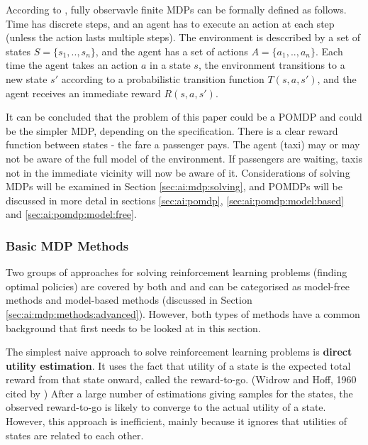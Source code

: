 According to \textcite{Spaan2012ai+pomdp}, fully observavle finite MDPs can be
formally defined as follows. Time has discrete steps, and an agent has to
execute an action at each step (unless the action lasts multiple steps). The
environment is desccribed by a set of states \(S = \{s_1,..,s_n\}\), and the
agent has a set of actions \(A = \{a_1,..,a_n\}\). Each time the agent takes an
action \(a\) in a state \(s\), the environment transitions to a new state
\(s'\) according to a probabilistic transition function \(T(s,a,s')\), and the
agent receives an immediate reward \(R(s,a,s')\).

It can be concluded that the problem of this paper could be a POMDP and could
be the simpler MDP, depending on the specification. There is a clear reward
function between states - the fare a passenger pays. The agent (taxi) may or
may not be aware of the full model of the environment. If passengers are
waiting, taxis not in the immediate vicinity will now be aware of it.
Considerations of solving MDPs will be examined in Section
\ref{sec:ai:mdp:solving}, and POMDPs will be discussed in more detal in
sections \ref{sec:ai:pomdp}, \ref{sec:ai:pomdp:model:based} and
\ref{sec:ai:pomdp:model:free}.


\subsubsection{Basic MDP Methods}
\label{sec:ai:mdp:methods:basic}

Two groups of approaches for solving reinforcement learning problems (finding
optimal policies) are covered by both \textcite{Russell2010ai+modern} and
\textcite{Sutton1998ai+reinforcement} and can be categorised as model-free
methods and model-based methods (discussed in Section
\ref{sec:ai:mdp:methods:advanced}). However, both types of methods have a
common background that first needs to be looked at in this section.

The simplest naive approach to solve reinforcement learning problems is
\textbf{direct utility estimation}. It uses the fact that utility of a state is
the expected total reward from that state onward, called the reward-to-go.
(Widrow and Hoff, 1960 cited by \textcite{Russell2010ai+modern}) After a large
number of estimations giving samples for the states, the observed reward-to-go
is likely to converge to the actual utility of a state. However, this approach
is inefficient, mainly because it ignores that utilities of states are related
to each other. \parencite{Russell2010ai+modern}

